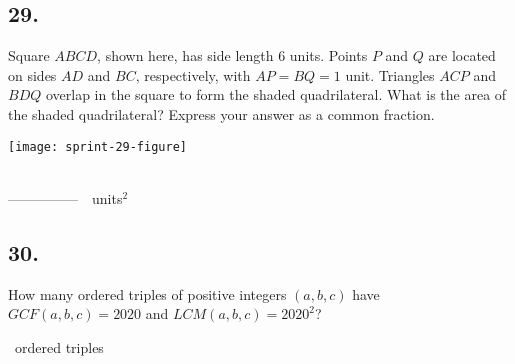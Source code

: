 \documentclass[12pt]{article}
\begin{document}
\subsection*{29.}
Square $ABCD$, shown here, has side length $6$ units. Points $P$ and $Q$ are located on sides $AD$ and $BC$, respectively, with $AP=BQ=1$ unit. Triangles $ACP$ and $BDQ$ overlap in the square to form the shaded quadrilateral. What is the area of the shaded quadrilateral? Express your answer as a common fraction. 

\begin{minipagex}[b]{\linewidth}
\centering
\texttt{[image: sprint-29-figure]}
\end{minipagex}

\nopagebreak

\begin{minipage}[b]{\linewidth}
\fbox{\phantom{ANSWER}}\\
\mbox{---------------}~~units$^2$\\
\fbox{\phantom{ANSWER}}
\end{minipage}


\begin{answer}
%
\end{answer}


\subsection*{30.}
How many ordered triples of positive integers $(a,b,c)$ have $GCF(a,b,c)=2020$ and $LCM(a,b,c)=2020^2$?

\nopagebreak

\fbox{\phantom{ANSWER}}~ordered triples
\end{document}
